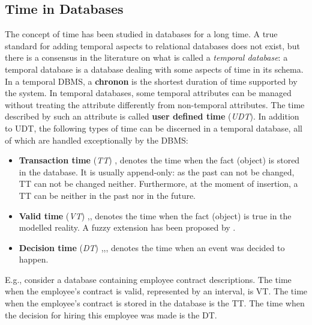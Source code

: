 %
%
\subsection{\label{subsec:time-in-databases}Time in Databases}
The concept of time has been studied in databases for a long time. A true standard for adding temporal aspects to relational databases does not exist, but there is a consensus in the literature \cite{Dyreson1994} on what is called a \emph{temporal database}: a temporal database is a database dealing with some aspects of time in its schema.
In a temporal DBMS, a \textbf{chronon} is the shortest duration of time supported by the system. In temporal databases, some temporal attributes can be managed without treating the attribute differently from non-temporal attributes. The time described by such an attribute is called \textbf{user defined time} (\emph{UDT}). In addition to UDT, the following types of time can be discerned in a temporal database, all of which are handled exceptionally by the DBMS:

\begin{itemize}
	\item
	\textbf{Transaction time} (\emph{TT}) \cite{Rowe1987},\cite{Jensen1991} denotes the time when the fact (object) is stored in the database. It is usually append-only: as the past can not be changed, TT can not be changed neither. Furthermore, at the moment of insertion, a TT can be neither in the past nor in the future.
	\item
	\textbf{Valid time} (\emph{VT}) \cite{Jensen1994},\cite{Sarda1990},\cite{McKenzie1981} denotes the time when the fact (object) is true in the modelled reality. A fuzzy extension has been proposed by \cite{Garrido2009}. 
	\item
	\textbf{Decision time} (\emph{DT}) \cite{Nascimento1995},\cite{Chakravarthy1994},\cite{Etzion1992},\cite{Ozsoyoglu1995} denotes the time when an event was decided to happen. 
	\end{itemize}
	
	E.g., consider a database containing employee contract descriptions. The time when the employee's contract is valid, represented by an interval, is VT. The time when the employee's contract is stored in the database is the TT. The time when the decision for hiring this employee was made is the DT.

